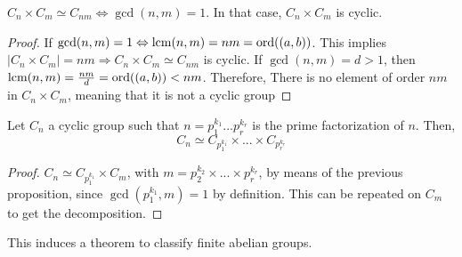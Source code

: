 \begin{theorem*}
  $C_n \times C_m \simeq C_{nm} \Leftrightarrow \gcd(n, m) = 1$. In that case, $C_n \times C_m$ is cyclic.
\end{theorem*}
\begin{proof}
  If $\gcd(n, m) = 1 \Leftrightarrow \operatorname{lcm}(n, m) = nm = \operatorname{ord}((a, b))$. This implies $|C_n \times C_m| = nm \Rightarrow C_n \times C_m \simeq C_{nm}$ is cyclic. 
  If $\gcd(n, m) = d > 1$, then $\operatorname{lcm}(n, m) = \frac{nm}{d} = \operatorname{ord}((a, b)) < nm$. Therefore, There is no element of order $nm$ in $C_n \times C_m$, meaning that it is not a cyclic group
\end{proof}

\begin{corollary}
  Let $C_n$ a cyclic group such that $n = p_1^{k_1}...p_r^{k_r}$ is the prime factorization of $n$. Then, 
  \[
    C_n \simeq C_{p_1^{k_1}} \times ... \times C_{p_r^{k_r}}
  \]
\end{corollary}
\begin{proof}
  $C_n \simeq C_{p_1^{k_1}} \times C_m$, with $m = p_2^{k_2} \times ... \times p_r^{k_r}$, by means of the previous proposition, since $\gcd(p_1^{k_1}, m) = 1$ by definition. This can be repeated on $C_m$ to get the decomposition.
\end{proof}


This induces a theorem to classify finite abelian groups. 


